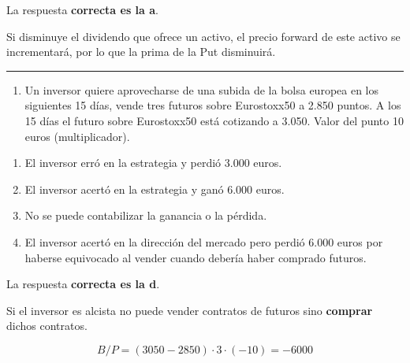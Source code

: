 \documentclass[
  letterpaper,
  DIV=11,
  numbers=noendperiod]{scrreprt}
\providecommand{\tightlist}{%
  \setlength{\itemsep}{0pt}\setlength{\parskip}{0pt}}\usepackage{longtable,booktabs,array}
\begin{document}
\begin{tcolorbox}[enhanced jigsaw, left=2mm, opacityback=0, colback=white, breakable, arc=.35mm, bottomrule=.15mm, rightrule=.15mm, toprule=.15mm, leftrule=.75mm, colframe=quarto-callout-tip-color-frame]
\begin{minipage}[t]{5.5mm}
\textcolor{quarto-callout-tip-color}{\faLightbulb}
\end{minipage}%
\begin{minipage}[t]{\textwidth - 5.5mm}

La respuesta \textbf{correcta es la a}.

Si disminuye el dividendo que ofrece un activo, el precio forward de
este activo se incrementará, por lo que la prima de la Put disminuirá.

\end{minipage}%
\end{tcolorbox}

\begin{center}\rule{0.5\linewidth}{0.5pt}\end{center}

\begin{enumerate}
\def\labelenumi{\arabic{enumi}.}
\setcounter{enumi}{14}
\tightlist
\item
  Un inversor quiere aprovecharse de una subida de la bolsa europea en
  los siguientes 15 días, vende tres futuros sobre Eurostoxx50 a 2.850
  puntos. A los 15 días el futuro sobre Eurostoxx50 está cotizando a
  3.050. Valor del punto 10 euros (multiplicador).
\end{enumerate}

\begin{enumerate}
\def\labelenumi{\alph{enumi})}
\item
  El inversor erró en la estrategia y perdió 3.000 euros.
\item
  El inversor acertó en la estrategia y ganó 6.000 euros.
\item
  No se puede contabilizar la ganancia o la pérdida.
\item
  El inversor acertó en la dirección del mercado pero perdió 6.000 euros
  por haberse equivocado al vender cuando debería haber comprado
  futuros.
\end{enumerate}

\begin{tcolorbox}[enhanced jigsaw, left=2mm, opacityback=0, colback=white, breakable, arc=.35mm, bottomrule=.15mm, rightrule=.15mm, toprule=.15mm, leftrule=.75mm, colframe=quarto-callout-tip-color-frame]
\begin{minipage}[t]{5.5mm}
\textcolor{quarto-callout-tip-color}{\faLightbulb}
\end{minipage}%
\begin{minipage}[t]{\textwidth - 5.5mm}

La respuesta \textbf{correcta es la d}.

Si el inversor es alcista no puede vender contratos de futuros sino
\textbf{comprar} dichos contratos.

\[B/P=(3050-2850)\cdot 3\cdot(-10)=-6000\]

\end{minipage}%
\end{tcolorbox}
\end{document}
